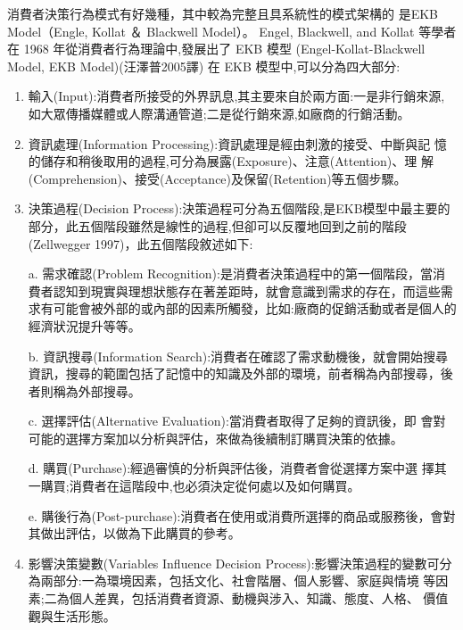 消費者決策行為模式有好幾種，其中較為完整且具系統性的模式架構的
是EKB Model（Engle, Kollat ＆ Blackwell Model）。
Engel, Blackwell, and Kollat 等學者在 1968 年從消費者行為理論中,發展出了 EKB 模型 (Engel-Kollat-Blackwell Model, EKB Model)(汪澤普2005譯)
在 EKB 模型中,可以分為四大部分\cite{汪澤普}:
\begin{enumerate}
\item 輸入(Input):消費者所接受的外界訊息,其主要來自於兩方面:一是非行銷來源,如大眾傳播媒體或人際溝通管道;二是從行銷來源,如廠商的行銷活動。
\item 資訊處理(Information Processing):資訊處理是經由刺激的接受、中斷與記
憶的儲存和稍後取用的過程,可分為展露(Exposure)、注意(Attention)、理
解(Comprehension)、接受(Acceptance)及保留(Retention)等五個步驟。
\item 決策過程(Decision Process):決策過程可分為五個階段,是EKB模型中最主要的部分，此五個階段雖然是線性的過程,但卻可以反覆地回到之前的階段(Zellwegger 1997)，此五個階段敘述如下:

a. 需求確認(Problem Recognition):是消費者決策過程中的第一個階段，當消費者認知到現實與理想狀態存在著差距時，就會意識到需求的存在，而這些需求有可能會被外部的或內部的因素所觸發，比如:廠商的促銷活動或者是個人的經濟狀況提升等等。

b. 資訊搜尋(Information Search):消費者在確認了需求動機後，就會開始搜尋資訊，搜尋的範圍包括了記憶中的知識及外部的環境，前者稱為內部搜尋，後者則稱為外部搜尋。

c. 選擇評估(Alternative Evaluation):當消費者取得了足夠的資訊後，即 會對可能的選擇方案加以分析與評估，來做為後續制訂購買決策的依據。

d. 購買(Purchase):經過審慎的分析與評估後，消費者會從選擇方案中選 擇其一購買;消費者在這階段中,也必須決定從何處以及如何購買。

e. 購後行為(Post-purchase):消費者在使用或消費所選擇的商品或服務後，會對其做出評估，以做為下此購買的參考。

\item 影響決策變數(Variables Influence Decision Process):影響決策過程的變數可分為兩部分:一為環境因素，包括文化、社會階層、個人影響、家庭與情境 等因素;二為個人差異，包括消費者資源、動機與涉入、知識、態度、人格、 價值觀與生活形態。
\end{enumerate}




